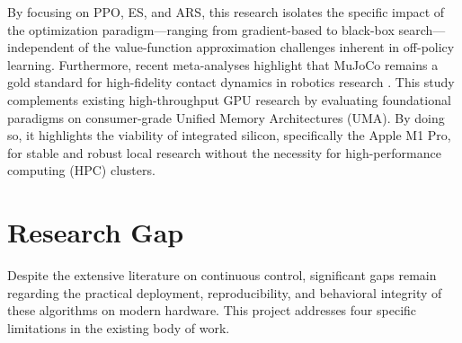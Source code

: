 By focusing on PPO, ES, and ARS, this research isolates the specific impact of the optimization paradigm—ranging from gradient-based to black-box search—independent of the value-function approximation challenges inherent in off-policy learning. Furthermore, recent meta-analyses highlight that MuJoCo remains a gold standard for high-fidelity contact dynamics in robotics research \citep{kaup2024review}. This study complements existing high-throughput GPU research by evaluating foundational paradigms on consumer-grade Unified Memory Architectures (UMA). By doing so, it highlights the viability of integrated silicon, specifically the Apple M1 Pro, for stable and robust local research without the necessity for high-performance computing (HPC) clusters.
\section{Research Gap}
\label{sec:research_gap}

Despite the extensive literature on continuous control, significant gaps remain regarding the practical deployment, reproducibility, and behavioral integrity of these algorithms on modern hardware. This project addresses four specific limitations in the existing body of work.

